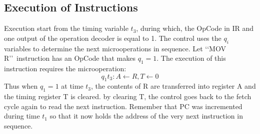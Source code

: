 \documentclass{book}
\begin{document}
\subsection{Execution of Instructions}

Execution start from the timing variable $t_3$, during which, the OpCode in IR and one output of the operation decoder is equal to 1. The control uses the $q_i$ variables to determine the next microoperations in sequence. Let \lq\lq MOV R\rq\rq\ instruction has an OpCode that makes $q_1 = 1$. The execution of this instruction requires the microoperation: $$q_1t_3:  A \leftarrow R, T \leftarrow 0$$
Thus when $q_1 = 1$ at time $t_3$, the contents of R are transferred into register A and the timing register T is cleared. by clearing T, the control goes back to the fetch cycle again to read the next instruction. Remember that PC was incremented during time $t_1$ so that it now holds the address of the very next instruction in sequence.
\end{document}
